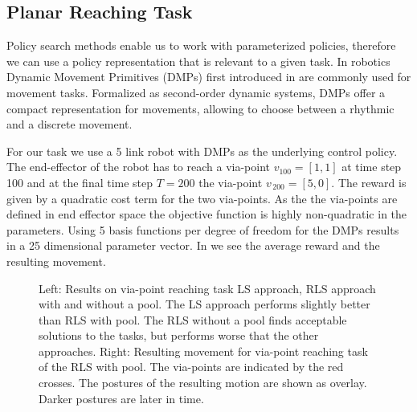 \subsection{Planar Reaching Task}
Policy search methods enable us to work with parameterized policies,
therefore we can use a policy representation that is relevant
to a given task.
In robotics Dynamic Movement Primitives 
(DMPs) first introduced in \citet{ijspeert2002learning} are commonly used for movement tasks.
Formalized as second-order dynamic systems, DMPs offer a compact
representation for movements, allowing to choose between a rhythmic
and a discrete movement. 

For our task we use a 5 link robot with DMPs as the underlying
control policy. The end-effector of the robot has
to reach a via-point $v_{100} = [1,1]$ at time step 100
and at the final time step $T = 200$ the via-point $v_{\, 200} = [5,0]$.
The reward is given by a quadratic cost term for
the two via-points.
As the the via-points are defined in end effector space the objective
function is highly non-quadratic in the parameters. Using
5 basis functions per degree of freedom for the DMPs results
in a 25 dimensional parameter vector.
In  we see the average reward and the resulting
movement.

\begin{figure}
    \centering
    \begin{minipage}{0.45\textwidth}
      \centering
      
      \hspace{1cm}                       
    \end{minipage}\hfill
    \begin{minipage}{0.45\textwidth}
      \centering
      
      \hspace{1cm}                       
    \end{minipage}
     \caption{\small
       {\color{gray!25!black!60} Left:}
       Results on via-point reaching task
       LS approach, RLS approach with and without a pool.
       The LS approach performs slightly better than RLS
       with pool. The RLS without a pool finds
       acceptable solutions to the tasks, but performs worse
       that the other approaches.
       {\color{gray!25!black!60} Right:} Resulting movement for
       via-point reaching task of the RLS with pool.
       The via-points are indicated by the red crosses. The
       postures of the resulting motion are shown as overlay.
       Darker postures are later in time.
     }
     \label{fig:reaching_result}      
\end{figure}


